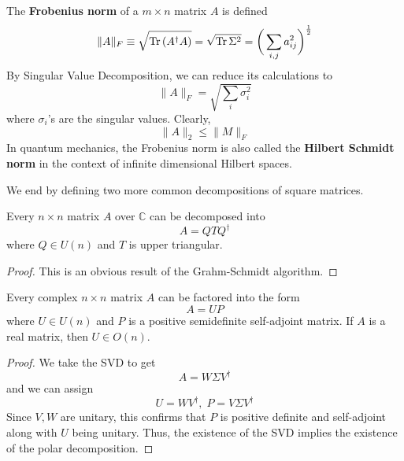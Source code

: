   \begin{definition}
    The \textbf{Frobenius norm} of a $m \times n$ matrix $A$ is defined
    \begin{equation}
      \|A\|_F \equiv \sqrt{\Tr{(A^\dagger A)}} = \sqrt{\Tr{\Sigma^2}} = \bigg( \sum_{i, j} a_{i j}^2 \bigg)^{\frac{1}{2}} 
    \end{equation}
    By Singular Value Decomposition, we can reduce its calculations to
    \begin{equation}
      \|A\|_F = \sqrt{\sum_i \sigma_i^2}
    \end{equation}
    where $\sigma_i$'s are the singular values. Clearly, 
    \begin{equation}
      \|A\|_2 \leq \|M\|_F
    \end{equation}
    In quantum mechanics, the Frobenius norm is also called the \textbf{Hilbert Schmidt norm} in the context of infinite dimensional Hilbert spaces. 
  \end{definition}

  We end by defining two more common decompositions of square matrices. 

  \begin{theorem}
    Every $n \times n$ matrix $A$ over $\mathbb{C}$ can be decomposed into
    \begin{equation}
      A = Q T Q^\dagger
    \end{equation}
    where $Q \in U(n)$ and $T$ is upper triangular. 
  \end{theorem}
  \begin{proof}
    This is an obvious result of the Grahm-Schmidt algorithm. 
  \end{proof}

  \begin{theorem}
    Every complex $n \times n$ matrix $A$ can be factored into the form
    \begin{equation}
      A = U P
    \end{equation}
    where $U \in U(n)$ and $P$ is a positive semidefinite self-adjoint matrix. If $A$ is a real matrix, then $U \in O(n)$. 
  \end{theorem}
  \begin{proof}
    We take the SVD to get 
    \begin{equation}
      A = W \Sigma V^\dagger
    \end{equation}
    and we can assign 
    \begin{equation}
      U = W V^\dagger, \; P = V \Sigma V^\dagger
    \end{equation}
    Since $V, W$ are unitary, this confirms that $P$ is positive definite and self-adjoint along with $U$ being unitary. Thus, the existence of the SVD implies the existence of the polar decomposition. 
  \end{proof}

